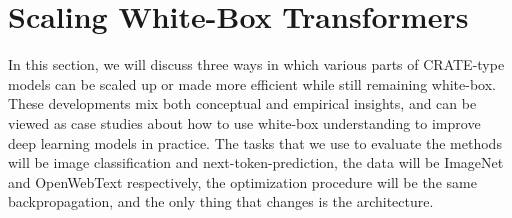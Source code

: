 \documentclass[../../book-main.tex]{subfiles}
\begin{document}







\section{Scaling White-Box Transformers}\label{sec:scalable}

In this section, we will discuss three ways in which various parts of CRATE-type models can be scaled up or made more efficient while still remaining white-box. These developments mix both conceptual and empirical insights, and can be viewed as case studies about how to use white-box understanding to improve deep learning models in practice. The tasks that we use to evaluate the methods will be image classification and next-token-prediction, the data will be ImageNet and OpenWebText respectively, the optimization procedure will be the same backpropagation, and the only thing that changes is the architecture.
\end{document}
